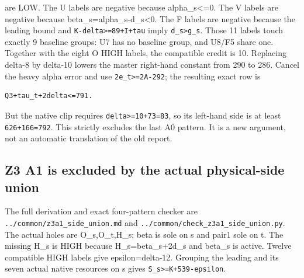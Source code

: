 \documentclass[10pt,a4paper]{article}
\theoremstyle{definition}
\begin{document}
are LOW. The U labels are negative because alpha\_\allowbreak{}s\textless=\allowbreak{}0. The V
labels are negative because beta\_\allowbreak{}s=\allowbreak{}alpha\_\allowbreak{}s-d\_\allowbreak{}s\textless0. The F
labels are negative because the leading bound and
\texttt{K-delta>=\allowbreak{}89+\allowbreak{}I+\allowbreak{}tau} imply
\texttt{d\_\allowbreak{}\allowbreak{}s>g\_\allowbreak{}\allowbreak{}s}. Those 11 labels touch exactly 9
baseline groups: U7 has no baseline group,\allowbreak{} and U8/F5 share one. Together
with the eight O HIGH labels,\allowbreak{} the compatible credit is 10. Replacing
delta-8 by delta-10 lowers the master right-hand constant from 290 to
286. Cancel the heavy alpha error and use
\texttt{2e\_\allowbreak{}\allowbreak{}t>=\allowbreak{}2A-292}; the resulting exact row is

\begin{lstlisting}
Q3+tau_t+2delta<=791.
\end{lstlisting}

But the native clip requires \texttt{delta>=\allowbreak{}10+\allowbreak{}73=\allowbreak{}83},\allowbreak{}
so its left-hand side is at least \texttt{626+\allowbreak{}166=\allowbreak{}792}.
This strictly excludes the last A0 pattern. It is a new argument,\allowbreak{} not an
automatic translation of the old report.

\hypertarget{z3-a1-is-excluded-by-the-actual-physical-side-union}{%
\subsection{Z3 A1 is excluded by the actual physical-side
union}\label{z3-a1-is-excluded-by-the-actual-physical-side-union}}

The full derivation and exact four-pattern checker are
\texttt{../\allowbreak{}common/\allowbreak{}z3a1\_\allowbreak{}\allowbreak{}side\_\allowbreak{}\allowbreak{}union.md} and
\texttt{../\allowbreak{}common/\allowbreak{}check\_\allowbreak{}\allowbreak{}z3a1\_\allowbreak{}\allowbreak{}side\_\allowbreak{}\allowbreak{}union.py}. The
actual holes are O\_\allowbreak{}s,\allowbreak{}O\_\allowbreak{}t,\allowbreak{}H\_\allowbreak{}s; beta is sole on s and pair1 sole on t.
The missing H\_\allowbreak{}s is HIGH because H\_\allowbreak{}s=\allowbreak{}beta\_\allowbreak{}s+\allowbreak{}2d\_\allowbreak{}s and beta\_\allowbreak{}s is
active. Twelve compatible HIGH labels give epsilon=\allowbreak{}delta-12. Grouping
the leading and its seven actual native resources on s gives
\texttt{S\_\allowbreak{}\allowbreak{}s>=\allowbreak{}K+\allowbreak{}539-epsilon}.
\end{document}
